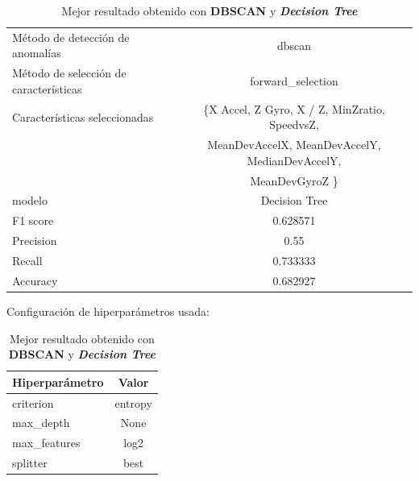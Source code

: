\begin{appendices}
		\begin{table}[htb]
			\centering
			\caption{Mejor resultado obtenido con \textbf{DBSCAN} y \textbf{\emph{Decision Tree}}}
			\label{table:23}
			\begin{tabular}{lc}
				\toprule
				\midrule
					  Método de detección de anomalías &                                             dbscan \\
				Método de selección de características &                                  forward\_selection \\
						 Características seleccionadas & \{X Accel, Z Gyro, X / Z, MinZratio, SpeedvsZ, \\
						 							   &   MeanDevAccelX, MeanDevAccelY, MedianDevAccelY, \\
													   &                                    MeanDevGyroZ \} \\
												modelo &                                      Decision Tree \\
											  F1 score &                                           0.628571 \\
											 Precision &                                               0.55 \\
												Recall &                                           0.733333 \\
											  Accuracy &                                           0.682927 \\
				\bottomrule
			\end{tabular}
			\newline
			\newline
			Configuración de hiperparámetros usada:
			\begin{tabular}{lc}
				\toprule
				Hiperparámetro &   Valor \\
				\midrule
					 criterion & entropy \\
					 max\_depth &    None \\
				  max\_features &    log2 \\
					  splitter &    best \\
				\bottomrule
			\end{tabular}
			
		\end{table}


\end{appendices}
